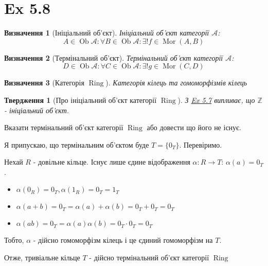 \documentclass[11pt, a4paper]{article} %
\newcommand{\Z}{\mathbb{Z}}
\DeclareMathOperator{\ob}{Ob}
\DeclareMathOperator{\mor}{Mor}
\DeclareMathOperator{\catring}{Ring}
\newtheorem*{proposition}{Твердження}
\newtheorem*{definition}{Визначення}
\begin{document}
\section*{Ex 5.8}

\begin{definition}[Ініціальний об'єкт]
    Ініціальний об'єкт категорії $\mathcal A$:
    \[A \in \ob \mathcal A: \forall B \in \ob \mathcal A: \exists! f \in \mor(A,B)\]
\end{definition}
\begin{definition}[Термінальний об'єкт]
    Термінальний об'єкт категорії $\mathcal A$:
    \[D \in \ob \mathcal A: \forall C \in \ob \mathcal A: \exists! g \in \mor(C,D)\]
\end{definition}
\begin{definition}[Категорія $\catring$]
    Категорія кілець та гомоморфізмів кілець
\end{definition}
\begin{proposition}[Про ініціальний об'єкт категорії $\catring$]
    З \hyperref[ex5.7]{Ex 5.7} випливає, що $\Z$ - ініціальний об'єкт.
\end{proposition}

\begin{mdframed}
    Вказати термінальний об'єкт категорії $\catring$ або довести що його не існує.
\end{mdframed}

Я припускаю, що термінальним об'єктом буде $T = \{0_T\}$.
Перевіримо.

Нехай $R$ - довільне кільце. Існує лише єдине відображення $\alpha: R\to T$: $\alpha(a) = 0_T$.
\begin{itemize}
    \item $\alpha(0_R) = 0_T, \alpha(1_R) = 0_T = 1_T$
    \item $\alpha(a+b) = 0_T = \alpha(a) + \alpha(b) = 0_T + 0_T = 0_T$
    \item $\alpha(ab) = 0_T = \alpha(a)\alpha(b) = 0_T\cdot 0_T = 0_T$
\end{itemize}
Тобто, $\alpha$ - дійсно гомоморфізм кілець і це єдиний гомоморфізм на $T$.

Отже, тривіальне кільце $T$ - дійсно термінальний об'єкт категорії $\catring$
\end{document}
